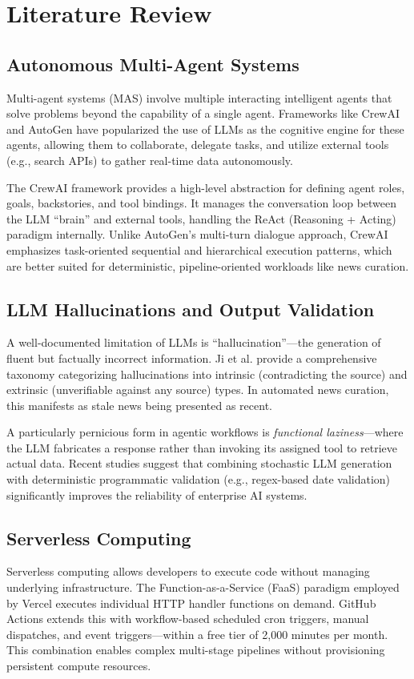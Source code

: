 \documentclass[12pt,a4paper]{report}
\begin{document}
\chapter{Literature Review}

\section{Autonomous Multi-Agent Systems}
Multi-agent systems (MAS) involve multiple interacting intelligent agents that solve problems beyond the capability of a single agent. Frameworks like CrewAI and AutoGen have popularized the use of LLMs as the cognitive engine for these agents, allowing them to collaborate, delegate tasks, and utilize external tools (e.g., search APIs) to gather real-time data autonomously.

The CrewAI framework provides a high-level abstraction for defining agent roles, goals, backstories, and tool bindings. It manages the conversation loop between the LLM ``brain'' and external tools, handling the ReAct (Reasoning + Acting) paradigm internally. Unlike AutoGen's multi-turn dialogue approach, CrewAI emphasizes task-oriented sequential and hierarchical execution patterns, which are better suited for deterministic, pipeline-oriented workloads like news curation.

\section{LLM Hallucinations and Output Validation}
A well-documented limitation of LLMs is ``hallucination''---the generation of fluent but factually incorrect information. Ji et al. provide a comprehensive taxonomy categorizing hallucinations into intrinsic (contradicting the source) and extrinsic (unverifiable against any source) types. In automated news curation, this manifests as stale news being presented as recent.

A particularly pernicious form in agentic workflows is \textit{functional laziness}---where the LLM fabricates a response rather than invoking its assigned tool to retrieve actual data. Recent studies suggest that combining stochastic LLM generation with deterministic programmatic validation (e.g., regex-based date validation) significantly improves the reliability of enterprise AI systems.

\section{Serverless Computing}
Serverless computing allows developers to execute code without managing underlying infrastructure. The Function-as-a-Service (FaaS) paradigm employed by Vercel executes individual HTTP handler functions on demand. GitHub Actions extends this with workflow-based scheduled cron triggers, manual dispatches, and event triggers---within a free tier of 2,000 minutes per month. This combination enables complex multi-stage pipelines without provisioning persistent compute resources.
\end{document}
